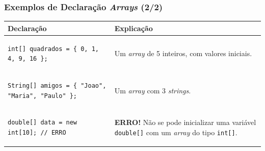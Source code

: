 \documentclass[xcolor={dvipsnames,table},aspectratio=169]{beamer}
\begin{document}
\begin{frame}[fragile]\frametitle{Exemplos de Declaração \emph{Arrays} (2/2)}
{\scriptsize
\begin{center}
  \begin{tabular}{|p{8cm}|p{5cm}|}
\hline
    \textbf{Declaração} & \textbf{Explicação} \\
\hline
{\scriptsize
\begin{verbatim}
int[] quadrados = { 0, 1, 4, 9, 16 };
\end{verbatim}
}
& Um \emph{array} de 5 inteiros, com valores iniciais.\\
\hline
{\scriptsize
\begin{verbatim}
String[] amigos = { "Joao", "Maria", "Paulo" };
\end{verbatim}
}
& Um \emph{array} com 3 \emph{strings}.\\
\hline
{\scriptsize
\begin{verbatim}
double[] data = new int[10]; // ERRO
\end{verbatim}
}
& \textbf{ERRO!} Não se pode inicializar uma variável \texttt{double[]} com um \emph{array} do tipo \texttt{int[]}.\\
\hline
  \end{tabular}
\end{center}
}
\end{frame}
\end{document}
